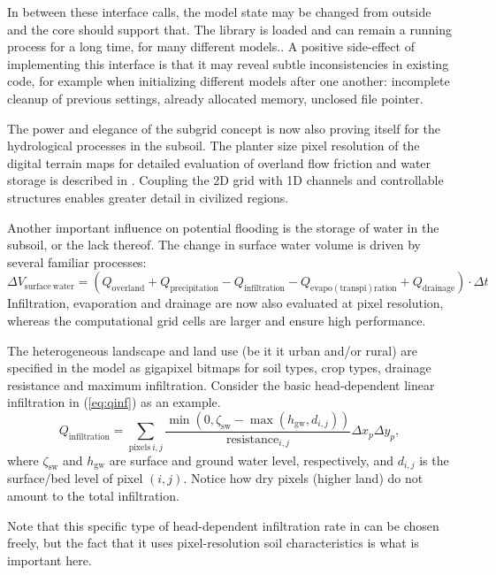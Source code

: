 \documentclass[a4paper]{article}
\begin{document}
In between these interface calls, the model state may be changed from outside and the core should support that. The library is loaded and can remain a running process for a long time, for many different models.. A positive side-effect of implementing this interface is that it may reveal subtle inconsistencies in existing code, for example when initializing different models after one another: incomplete cleanup of previous settings, already allocated memory, unclosed file pointer.


The power and elegance of the subgrid concept is now also proving itself for the hydrological processes in the subsoil. The planter size pixel resolution of the digital terrain maps for detailed evaluation of overland flow friction and water storage is described in \citet{Stelling2012}. Coupling the 2D grid with 1D channels and controllable structures enables greater detail in civilized regions.


Another important influence on potential flooding is the storage of water in the subsoil, or the lack thereof. The change in surface water volume is driven by several familiar processes:
\[
\Delta V_\mathrm{surface\ water}=(Q_\mathrm{overland} + Q_\mathrm{precipitation} - Q_\mathrm{infiltration} - Q_\mathrm{evapo(transpi)ration} + Q_\mathrm{drainage})\cdot\Delta t
\]
Infiltration, evaporation and drainage are now also evaluated at pixel resolution, whereas the computational grid cells are larger and ensure high performance.

The heterogeneous landscape and land use (be it it urban and/or rural) are specified in the model as gigapixel bitmaps for soil types, crop types, drainage resistance and maximum infiltration. Consider the basic head-dependent linear infiltration in (\ref{eq:qinf}) as an example.
%
\begin{equation}
\label{eq:qinf}
Q_\mathrm{infiltration}= \sum_{\mathrm{pixels}\ i,j} \frac{\min(0, \zeta_\mathrm{sw}-\max(h_\mathrm{gw}, d_{i,j}))}{\mathrm{resistance}_{i,j}}\Delta x_p \Delta y_p,
\end{equation}
where $\zeta_\mathrm{sw}$ and $h_\mathrm{gw}$ are surface and ground water level, respectively, and $d_{i,j}$ is the surface/bed level of pixel $(i,j)$. Notice how dry pixels (higher land) do not amount to the total infiltration.


Note that this specific type of head-dependent infiltration rate in can be chosen freely, but the fact that it uses pixel-resolution soil characteristics is what is important here.
\end{document}
